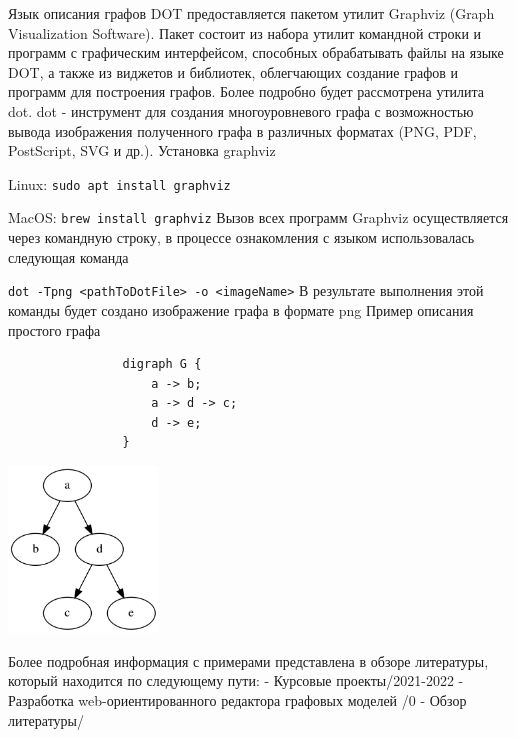 \def\notedate{2021.10.05}
\def\currentauthor{Ершов В. (РК6-72Б)}

Язык описания графов DOT предоставляется пакетом утилит Graphviz (Graph Visualization Software). Пакет состоит из набора утилит командной строки и программ с графическим интерфейсом, способных обрабатывать файлы на языке DOT, а также из виджетов и библиотек, облегчающих создание графов и программ для построения графов. Более подробно будет рассмотрена утилита dot.
\newline\newline
dot - инструмент для создания многоуровневого графа с возможностью вывода изображения полученного графа в различных форматах (PNG, PDF, PostScript, SVG и др.).
\newline\newline
Установка graphviz

\quad Linux: \lstinline$sudo apt install graphviz$

\quad MacOS: \lstinline$brew install graphviz$
\newline\newline
Вызов всех программ Graphviz осуществляется через командную строку, в процессе ознакомления с языком использовалась следующая команда

\quad\lstinline$dot -Tpng <pathToDotFile> -o <imageName>$
\newline
В результате выполнения этой команды будет создано изображение графа в формате png
\newline\newline
Пример описания простого графа\newline\newline
\begin{minipage}{0.2\textwidth}
		\begin{verbatim}
				digraph G {
				    a -> b;
				    a -> d -> c;
				    d -> e;
				}
		\end{verbatim}
	\end{minipage}
	\hfill
	\begin{minipage}{0.75\textwidth}
	 	{\includegraphics[width=0.3\textwidth]{ResearchNotes/rndhpc_not_edt_2021_10_05/image4.png}\xspace}
	\end{minipage}
\newline\newline\newline
Более подробная информация с примерами представлена в обзоре литературы, который находится по следующему пути:
 - Курсовые проекты/2021-2022 - Разработка web-ориентированного редактора графовых моделей /0 - Обзор литературы/	

\noteattributes{}
